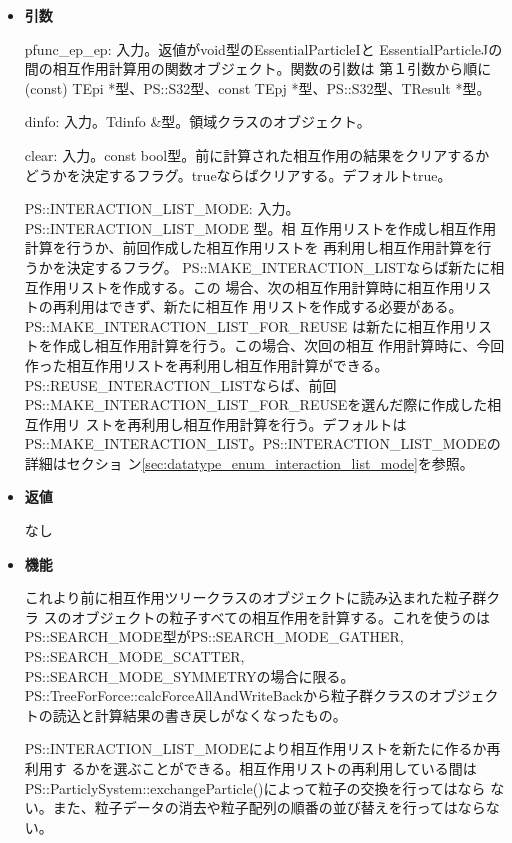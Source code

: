 \begin{itemize}

\item {\bf 引数}

pfunc\_ep\_ep: 入力。返値がvoid型のEssentialParticleIと
EssentialParticleJの間の相互作用計算用の関数オブジェクト。関数の引数は
第１引数から順に(const) TEpi *型、PS::S32型、const
TEpj *型、PS::S32型、TResult *型。

dinfo: 入力。Tdinfo \&型。領域クラスのオブジェクト。

clear: 入力。const bool型。前に計算された相互作用の結果をクリアするか
どうかを決定するフラグ。trueならばクリアする。デフォルトtrue。

PS::INTERACTION\_LIST\_MODE: 入力。PS::INTERACTION\_LIST\_MODE 型。相
互作用リストを作成し相互作用計算を行うか、前回作成した相互作用リストを
再利用し相互作用計算を行うかを決定するフラグ。
PS::MAKE\_INTERACTION\_LISTならば新たに相互作用リストを作成する。この
場合、次の相互作用計算時に相互作用リストの再利用はできず、新たに相互作
用リストを作成する必要がある。PS::MAKE\_INTERACTION\_LIST\_FOR\_REUSE
は新たに相互作用リストを作成し相互作用計算を行う。この場合、次回の相互
作用計算時に、今回作った相互作用リストを再利用し相互作用計算ができる。
PS::REUSE\_INTERACTION\_LISTならば、前回
PS::MAKE\_INTERACTION\_LIST\_FOR\_REUSEを選んだ際に作成した相互作用リ
ストを再利用し相互作用計算を行う。デフォルトは
PS::MAKE\_INTERACTION\_LIST。PS::INTERACTION\_LIST\_MODEの詳細はセクショ
ン\ref{sec:datatype_enum_interaction_list_mode}を参照。

\item {\bf 返値}

なし

\item {\bf 機能}

これより前に相互作用ツリークラスのオブジェクトに読み込まれた粒子群クラ
スのオブジェクトの粒子すべての相互作用を計算する。これを使うのは
PS::SEARCH\_MODE型がPS::SEARCH\_MODE\_GATHER,
PS::SEARCH\_MODE\_SCATTER,\\ PS::SEARCH\_MODE\_SYMMETRYの場合に限る。
PS::TreeForForce::calcForceAllAndWriteBackから粒子群クラスのオブジェク
トの読込と計算結果の書き戻しがなくなったもの。

PS::INTERACTION\_LIST\_MODEにより相互作用リストを新たに作るか再利用す
るかを選ぶことができる。相互作用リストの再利用している間は
PS::ParticlySystem::exchangeParticle()によって粒子の交換を行ってはなら
ない。また、粒子データの消去や粒子配列の順番の並び替えを行ってはならな
い。

\end{itemize}

